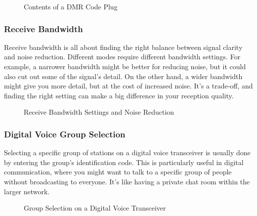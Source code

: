 \begin{figure}[h]
    \centering
    \caption{Contents of a DMR Code Plug}
    \label{fig:dmr-code-plug}
\end{figure}

\subsubsection*{Receive Bandwidth}

Receive bandwidth is all about finding the right balance between signal clarity and noise reduction. Different modes require different bandwidth settings. For example, a narrower bandwidth might be better for reducing noise, but it could also cut out some of the signal’s detail. On the other hand, a wider bandwidth might give you more detail, but at the cost of increased noise. It’s a trade-off, and finding the right setting can make a big difference in your reception quality.

\begin{figure}[h]
    \centering
    \caption{Receive Bandwidth Settings and Noise Reduction}
    \label{fig:receive-bandwidth}
\end{figure}

\subsubsection*{Digital Voice Group Selection}

Selecting a specific group of stations on a digital voice transceiver is usually done by entering the group’s identification code. This is particularly useful in digital communication, where you might want to talk to a specific group of people without broadcasting to everyone. It’s like having a private chat room within the larger network.

\begin{figure}[h]
    \centering
    \caption{Group Selection on a Digital Voice Transceiver}
    \label{fig:group-selection}
\end{figure}

